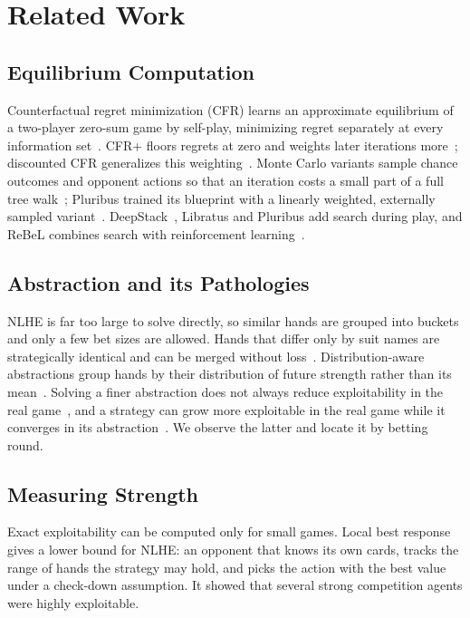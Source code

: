 \documentclass{ieeeaccess}
\begin{document}
\section{Related Work}
\label{sec:related}

\subsection{Equilibrium Computation}
Counterfactual regret minimization (CFR) learns an approximate equilibrium of a two-player
zero-sum game by self-play, minimizing regret separately at every information
set~\cite{zinkevich2007}. CFR+ floors regrets at zero and weights later iterations
more~\cite{tammelin2014}; discounted CFR generalizes this weighting~\cite{brown2019dcfr}. Monte
Carlo variants sample chance outcomes and opponent actions so that an iteration costs a small
part of a full tree walk~\cite{lanctot2009}; Pluribus trained its blueprint with a linearly
weighted, externally sampled variant~\cite{brown2019}. DeepStack~\cite{moravcik2017}, Libratus
and Pluribus add search during play, and ReBeL combines search with reinforcement
learning~\cite{brown2020}.

\subsection{Abstraction and its Pathologies}
NLHE is far too large to solve directly, so similar hands are grouped into buckets and only a
few bet sizes are allowed. Hands that differ only by suit names are strategically identical and
can be merged without loss~\cite{waugh2013}. Distribution-aware abstractions group hands by
their distribution of future strength rather than its mean~\cite{johanson2013}. Solving a finer
abstraction does not always reduce exploitability in the real game~\cite{waugh2009}, and a
strategy can grow more exploitable in the real game while it converges in its
abstraction~\cite{johanson2013}. We observe the latter and locate it by betting round.

\subsection{Measuring Strength}
Exact exploitability can be computed only for small games. Local best response~\cite{lisy2017}
gives a lower bound for NLHE: an opponent that knows its own cards, tracks the range of hands
the strategy may hold, and picks the action with the best value under a check-down assumption.
It showed that several strong competition agents were highly exploitable.
\end{document}
